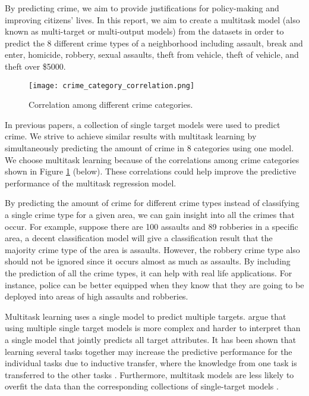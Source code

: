 \documentclass{article}
\begin{document}
By predicting crime, we aim to provide justifications for policy-making and improving citizens’ lives. In this report, we aim to create a multitask model (also known as multi-target or multi-output models) from the datasets in order to predict the 8 different crime types of a neighborhood including assault, break and enter, homicide, robbery, sexual assaults, theft from vehicle, theft of vehicle, and theft over \$5000.

\begin{figure}[h]
  \centering
  \texttt{[image: crime\_category\_correlation.png]}
  \caption{Correlation among different crime categories.}
  \label{correlation}
\end{figure}

In previous papers, a collection of single target models were used to predict crime. We strive to achieve similar results with multitask learning by simultaneously predicting the amount of crime in 8 categories using one model. We choose multitask learning because of the correlations among crime categories shown in Figure \ref{correlation} (below). These correlations could help improve the predictive performance of the  multitask regression model.

By predicting the amount of crime for different crime types instead of classifying a single crime type for a given area, we can gain insight into all the crimes that occur. For example, suppose there are 100 assaults and 89 robberies in a specific area, a decent classification model will give a classification result that the majority crime type of the area is assaults. However, the robbery crime type also should not be ignored since it occurs almost as much as assaults. By including the prediction of all the crime types, it can help with real life applications. For instance, police can be better equipped when they know that they are going to be deployed into areas of high assaults and robberies.

Multitask learning uses a single model to predict multiple targets. \citet{zenko_learning_2008} argue that using multiple single target models is more complex and harder to interpret than a single model that jointly predicts all target attributes. It has been shown that learning several tasks together may increase the predictive performance for the individual tasks due to inductive transfer, where the knowledge from one task is transferred to the other tasks \citep{piccart_empirical_2008,suzuki_bloomy_2001,kocev_using_2009}. Furthermore, multitask models are less likely to overfit the data than the corresponding collections of single-target models \citep{caruana_multitask_1998}.
\end{document}
